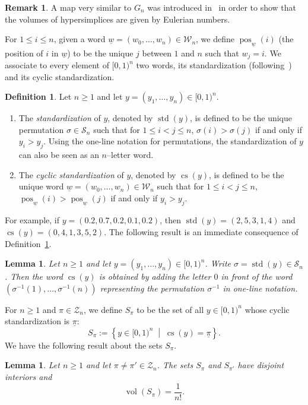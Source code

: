 \documentclass[11pt]{article}
\newtheorem{lemm}[theo]{Lemma}
\theoremstyle{definition}
\newtheorem{defi}[theo]{Definition}
\newtheorem{rema}[theo]{Remark}
\numberwithin{equation}{section}
\numberwithin{figure}{section}
\numberwithin{table}{section}
\DeclareMathOperator{\vol}{vol}
\DeclareMathOperator{\std}{std}
\DeclareMathOperator{\cs}{cs}
\DeclareMathOperator{\pos}{pos}
\newcommand{\calS}{\mathcal S}
\newcommand{\calZ}{\mathcal Z}
\newcommand{\calW}{\mathcal W}
\begin{document}
\begin{rema}
A map very similar to $G_n$ was introduced in~\cite{Sta77} in order to show that the volumes of hypersimplices are given by Eulerian numbers.
\end{rema}

For $1\leq i \leq n$, given a word $\underline{w}=(w_0,\ldots,w_n)\in\calW_n$, we define $\pos_{\underline{w}}(i)$ (the position of $i$ in $\underline{w}$) to be the unique $j$ between $1$ and $n$ such that $w_j=i$. We associate to every element of $[0,1)^n$ two words, its standardization (following~\cite{HJV16}) and its cyclic standardization.

\goodbreak
\begin{defi}\label{defn:standardizations}
Let $n\geq1$ and let $y=(y_1,\ldots,y_n)\in[0,1)^n$.
\begin{enumerate}
\item The \emph{standardization} of $y$, denoted by $\std(y)$, is defined to be the unique permutation $\sigma\in\calS_n$ such that for $1\leq i<j \leq n$, $\sigma(i) > \sigma(j)$ if and only if $y_i > y_j$. Using the one-line notation for permutations, the standardization of $y$ can also be seen as an $n$--letter word.\label{list-defi_4.3.1}
\item The \emph{cyclic standardization} of $y$, denoted by $\cs(y)$, is defined to be the unique word $\underline{w}=(w_0,\ldots,w_n)\in\calW_n$ such that for $1\leq i<j \leq n$, $\pos_{\underline{w}}(i) > \pos_{\underline{w}}(j)$ if and only if $y_i > y_j$.\label{list-defi_4.3.2}
\end{enumerate}
\end{defi}

For example, if $y=(0.2,0.7,0.2,0.1,0.2)$, then $\std(y)=(2,5,3,1,4)$ and $\cs(y)=(0,4,1,3,5,2)$. The following result is an immediate consequence of Definition~\ref{defn:standardizations}.

\begin{lemm}\label{lem:standardization}
Let $n\geq1$ and let $y=(y_1,\ldots,y_n)\in[0,1)^n$. Write $\sigma=\std(y)\in\calS_n$. Then the word $\cs(y)$ is obtained by adding the letter $0$ in front of the word $(\sigma^{-1} (1), \ldots, \sigma^{-1} (n))$ representing the permutation $\sigma^{-1}$ in one-line notation.
\end{lemm}

For $n\geq1$ and $\pi\in\calZ_n$, we define $S_\pi$ to be the set of all $y\in[0,1)^n$ whose cyclic standardization is $\underline{\pi}$:
\[
S_\pi:= \left\{y\in[0,1)^n\;\middle|\;\cs(y)=\underline{\pi} \right\}.
\]
We have the following result about the sets $S_\pi$.
\begin{lemm}\label{lem:simplexvolume}
Let $n\geq1$ and let $\pi\neq \pi' \in \calZ_n$. The sets $S_\pi$ and $S_{\pi'}$ have disjoint interiors and
\[
\vol(S_\pi) = \frac{1}{n!}.
\]
\end{lemm}
\end{document}
